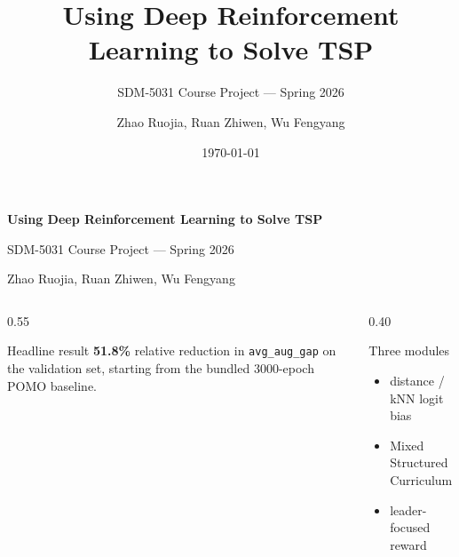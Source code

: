 \documentclass[aspectratio=169,11pt]{beamer}
\title{Using Deep Reinforcement Learning to Solve TSP}
\subtitle{SDM-5031 Course Project --- Spring 2026}
\author{Zhao Ruojia, Ruan Zhiwen, Wu Fengyang}
\date{\today}
\begin{document}
\begin{frame}[plain]
  \vspace{0.5cm}
  {\color{sdmblue}\LARGE\textbf{Using Deep Reinforcement Learning to Solve TSP}\par}
  \vspace{0.1cm}
  {\large SDM-5031 Course Project --- Spring 2026\par}
  \vspace{0.4cm}
  {Zhao Ruojia, Ruan Zhiwen, Wu Fengyang\par}

  \vspace{1.0cm}
  \begin{columns}[T,totalwidth=\textwidth]
    \begin{column}{0.55\textwidth}
      \begin{block}{Headline result}
        \textbf{51.8\%} relative reduction in \texttt{avg\_aug\_gap}
        on the validation set, starting from the bundled
        3000-epoch POMO baseline.
      \end{block}
    \end{column}
    \begin{column}{0.40\textwidth}
      \begin{alertblock}{Three modules}
        \begin{itemize}
          \item distance / kNN logit bias
          \item Mixed Structured Curriculum
          \item leader-focused reward
        \end{itemize}
      \end{alertblock}
    \end{column}
  \end{columns}
  \vfill
\end{frame}
\end{document}
